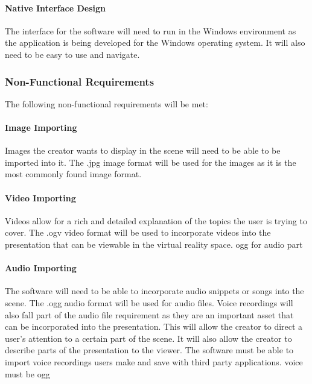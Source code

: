 \documentclass{article}
\begin{document}
		\paragraph{Native Interface Design}

		The interface for the software will need to run in the Windows environment as the application is being developed for the Windows operating system.
		It will also need to be easy to use and navigate.

	\subsubsection{Non-Functional Requirements}

	The following non-functional requirements will be met:

		\paragraph{Image Importing}

		Images the creator wants to display in the scene will need to be able to be imported into it.
		The .jpg image format will be used for the images as it is the most commonly found image format.

		\paragraph{Video Importing}

		Videos allow for a rich and detailed explanation of the topics the user is trying to cover.
		The .ogv video format will be used to incorporate videos into the presentation that can be viewable in the virtual reality space. ogg for audio part

		\paragraph{Audio Importing}

		The software will need to be able to incorporate audio snippets or songs into the scene.
		The .ogg audio format will be used for audio files.
		Voice recordings will also fall part of the audio file requirement as they are an important asset that can be incorporated into the presentation.
		This will allow the creator to direct a user's attention to a certain part of the scene.
		It will also allow the creator to describe parts of the presentation to the viewer.
		The software must be able to import voice recordings users make and save with third party applications. voice must be ogg
\end{document}
